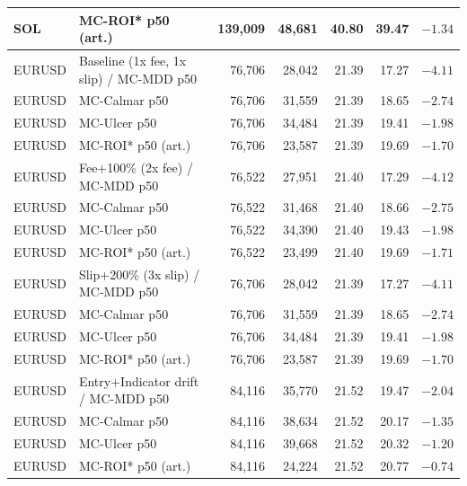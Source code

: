 \begin{table}[ht]
\begin{tabular}{llrrrrr}
SOL & \hspace{1em}MC-ROI* p50 (art.) & 139,009 & 48,681 & 40.80 & 39.47 & $-1.34$ \\
\midrule
EURUSD & Baseline (1x fee, 1x slip) / MC-MDD p50 & 76,706 & 28,042 & 21.39 & 17.27 & $-4.11$ \\
EURUSD & \hspace{1em}MC-Calmar p50 & 76,706 & 31,559 & 21.39 & 18.65 & $-2.74$ \\
EURUSD & \hspace{1em}MC-Ulcer p50 & 76,706 & 34,484 & 21.39 & 19.41 & $-1.98$ \\
EURUSD & \hspace{1em}MC-ROI* p50 (art.) & 76,706 & 23,587 & 21.39 & 19.69 & $-1.70$ \\
EURUSD & Fee+100\% (2x fee) / MC-MDD p50 & 76,522 & 27,951 & 21.40 & 17.29 & $-4.12$ \\
EURUSD & \hspace{1em}MC-Calmar p50 & 76,522 & 31,468 & 21.40 & 18.66 & $-2.75$ \\
EURUSD & \hspace{1em}MC-Ulcer p50 & 76,522 & 34,390 & 21.40 & 19.43 & $-1.98$ \\
EURUSD & \hspace{1em}MC-ROI* p50 (art.) & 76,522 & 23,499 & 21.40 & 19.69 & $-1.71$ \\
EURUSD & Slip+200\% (3x slip) / MC-MDD p50 & 76,706 & 28,042 & 21.39 & 17.27 & $-4.11$ \\
EURUSD & \hspace{1em}MC-Calmar p50 & 76,706 & 31,559 & 21.39 & 18.65 & $-2.74$ \\
EURUSD & \hspace{1em}MC-Ulcer p50 & 76,706 & 34,484 & 21.39 & 19.41 & $-1.98$ \\
EURUSD & \hspace{1em}MC-ROI* p50 (art.) & 76,706 & 23,587 & 21.39 & 19.69 & $-1.70$ \\
EURUSD & Entry+Indicator drift / MC-MDD p50 & 84,116 & 35,770 & 21.52 & 19.47 & $-2.04$ \\
EURUSD & \hspace{1em}MC-Calmar p50 & 84,116 & 38,634 & 21.52 & 20.17 & $-1.35$ \\
EURUSD & \hspace{1em}MC-Ulcer p50 & 84,116 & 39,668 & 21.52 & 20.32 & $-1.20$ \\
EURUSD & \hspace{1em}MC-ROI* p50 (art.) & 84,116 & 24,224 & 21.52 & 20.77 & $-0.74$ \\

\end{tabular}
\end{table}
